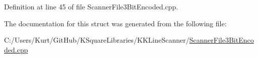 Definition at line 45 of file Scanner\+File3\+Bit\+Encoded.\+cpp.



The documentation for this struct was generated from the following file\+:\begin{DoxyCompactItemize}
\item 
C\+:/\+Users/\+Kurt/\+Git\+Hub/\+K\+Square\+Libraries/\+K\+K\+Line\+Scanner/\hyperlink{_scanner_file3_bit_encoded_8cpp}{Scanner\+File3\+Bit\+Encoded.\+cpp}\end{DoxyCompactItemize}
